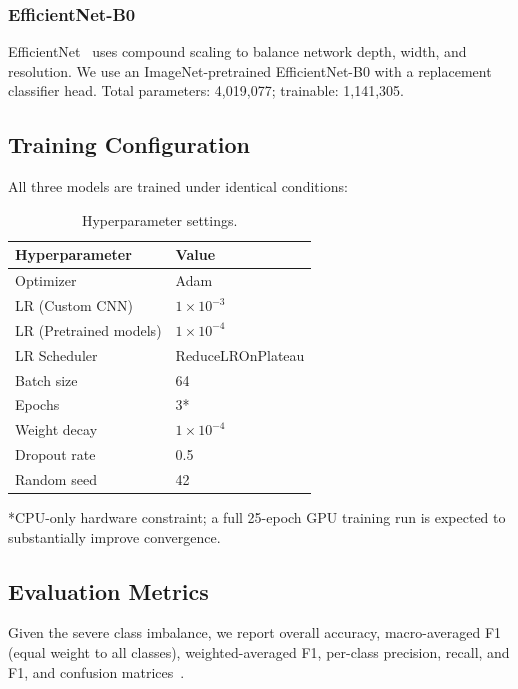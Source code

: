 \documentclass[conference]{IEEEtran}
\begin{document}
\subsubsection{EfficientNet-B0}
EfficientNet~\cite{tan2019} uses compound scaling to balance network depth,
width, and resolution. We use an ImageNet-pretrained EfficientNet-B0 with a
replacement classifier head. Total parameters: 4{,}019{,}077; trainable:
1{,}141{,}305.

\subsection{Training Configuration}

All three models are trained under identical conditions:

\begin{table}[H]
\centering
\caption{Hyperparameter settings.}
\label{tab:hyperparameters}
\begin{tabular}{@{}ll@{}}
\toprule
\textbf{Hyperparameter} & \textbf{Value} \\
\midrule
Optimizer               & Adam \\
LR (Custom CNN)         & $1 \times 10^{-3}$ \\
LR (Pretrained models)  & $1 \times 10^{-4}$ \\
LR Scheduler            & ReduceLROnPlateau \\
Batch size              & 64 \\
Epochs                  & 3* \\
Weight decay            & $1 \times 10^{-4}$ \\
Dropout rate            & 0.5 \\
Random seed             & 42 \\
\bottomrule
\end{tabular}

\smallskip
\noindent\footnotesize{*CPU-only hardware constraint; a full 25-epoch GPU
training run is expected to substantially improve convergence.}
\end{table}

\subsection{Evaluation Metrics}

Given the severe class imbalance, we report overall accuracy, macro-averaged
F1 (equal weight to all classes), weighted-averaged F1, per-class precision,
recall, and F1, and confusion matrices~\cite{he2009}.
\end{document}
